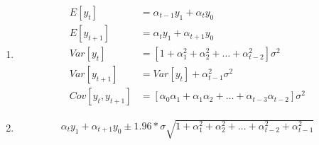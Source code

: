 \begin{exercice}
\begin{sol}
\begin{enumerate}
\item
  \begin{align*}
    E\left[y_t\right] &= \alpha_{t-1} y_1 + \alpha_t y_0 \\
    E\left[y_{t+1}\right] &= \alpha_{t} y_1 + \alpha_{t+1} y_0 \\
    Var\left[y_t\right] &= \left[1+\alpha_1^2 + \alpha_2^2 + \ldots + \alpha_{t-2}^2\right]\sigma^2 \\
    Var\left[y_{t+1}\right] &= Var\left[y_t\right] + \alpha_{t-1}^2 \sigma^2 \\
    Cov\left[y_{t},y_{t+1}\right] &= \left[\alpha_0\alpha_1 + \alpha_1\alpha_2 + \ldots + \alpha_{t-3}\alpha_{t-2}\right] \sigma^2
  \end{align*}
\item
  \begin{align*}
    \alpha_{t} y_1 + \alpha_{t+1} y_0 \pm 1.96 * \sigma \sqrt{1+\alpha_1^2 + \alpha_2^2 + \ldots + \alpha_{t-2}^2+\alpha_{t-1}^2}
  \end{align*}
\end{enumerate}
\end{sol}
\end{exercice}


